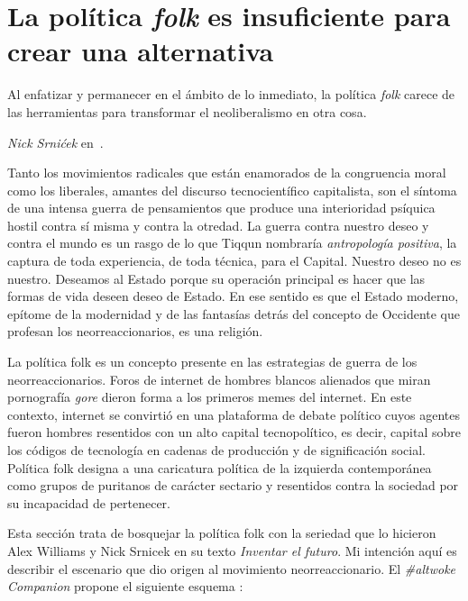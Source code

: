 \section{La política \emph{folk} es insuficiente para crear una alternativa}
\label{sec:la-política-folk}

\epigraph{Al enfatizar y permanecer en el ámbito de lo inmediato, la política \emph{folk} carece de las herramientas para transformar el neoliberalismo en otra cosa.}{\emph{Nick Srnićek} en~\autocite{srnicekInventarFuturoPoscapitalismo2017}.}

Tanto los movimientos radicales que están enamorados de la congruencia moral como los liberales, amantes del discurso tecnocientífico capitalista, son el síntoma de una intensa guerra de pensamientos que produce una interioridad psíquica hostil contra sí misma y contra la otredad. La guerra contra nuestro deseo y contra el mundo es un rasgo de lo que Tiqqun nombraría \emph{antropología positiva}, la captura de toda experiencia, de toda técnica, para el Capital. Nuestro deseo no es nuestro. Deseamos al Estado porque su operación principal es hacer que las formas de vida deseen deseo de Estado. En ese sentido es que el Estado moderno, epítome de la modernidad y de las fantasías detrás del concepto de Occidente que profesan los neorreaccionarios, es una religión.

La política folk es un concepto presente en las estrategias de guerra de los neorreaccionarios. Foros de internet de hombres blancos alienados que miran pornografía \emph{gore} dieron forma a los primeros memes del internet. En este contexto, internet se convirtió en una plataforma de debate político cuyos agentes fueron hombres resentidos con un alto capital tecnopolítico, es decir, capital sobre los códigos de tecnología en cadenas de producción y de significación social. Política folk designa a una caricatura política de la izquierda contemporánea como grupos de puritanos de carácter sectario y resentidos contra la sociedad por su incapacidad de pertenecer.

Esta sección trata de bosquejar la política folk con la seriedad que lo hicieron Alex Williams y Nick Srnicek en su texto \emph{Inventar el futuro}. Mi intención aquí es describir el escenario que dio origen al movimiento neorreaccionario. El \emph{\#altwoke Companion} propone el siguiente esquema \autocite{AltWokeCompanion2017}:


